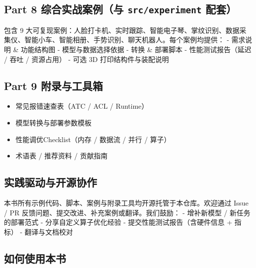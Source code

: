 \subsection{\texorpdfstring{Part 8 综合实战案例（与
\texttt{src/experiment}
配套）}{Part 8 综合实战案例（与 src/experiment 配套）}}\label{part-8-ux7efcux5408ux5b9eux6218ux6848ux4f8bux4e0e-srcexperiment-ux914dux5957}

包含 9
大可复现案例：人脸打卡机、实时跟踪、智能电子琴、掌纹识别、数据采集仪、智能小车、智能相册、手势识别、聊天机器人。每个案例均提供：
- 需求说明 \& 功能结构图 - 模型与数据选择依据 - 转换 \& 部署脚本 -
性能测试报告（延迟 / 吞吐 / 资源占用） - 可选 3D 打印结构件与装配说明

\subsection{Part 9
附录与工具箱}\label{part-9-ux9644ux5f55ux4e0eux5de5ux5177ux7bb1}

\begin{itemize}
\tightlist
\item
  常见报错速查表（ATC / ACL / Runtime）
\item
  模型转换与部署参数模板
\item
  性能调优Checklist（内存 / 数据流 / 并行 / 算子）
\item
  术语表 / 推荐资料 / 贡献指南
\end{itemize}

\subsection*{实践驱动与开源协作}\label{实践驱动与开源协作}

本书所有示例代码、脚本、案例与附录工具均开源托管于本仓库。欢迎通过 Issue
/ PR 反馈问题、提交改进、补充案例或翻译。我们鼓励： - 增补新模型 /
新任务的部署范式 - 分享自定义算子优化经验 - 提交性能测试报告（含硬件信息
+ 指标） - 翻译与文档校对

\subsection*{如何使用本书}\label{如何使用本书}


